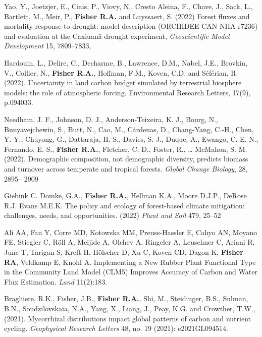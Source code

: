 \documentclass[10pt]{article}
\newenvironment{lonelist}[1][\enskip\textbullet]%
        {\vspace{-\baselineskip}\begin{list}{#1}{%
        \setlength{\itemindent}{-3pt} 
        \setlength{\partopsep}{0pt}%
        \setlength{\leftmargin}{10pt}
        \setlength{\topsep}{15pt}}}
        {\end{list}\vspace{-.3\baselineskip}}
\begin{document}
\begin{lonelist}
\item[72] Yao, Y., Joetzjer, E., Ciais, P., Viovy, N., Cresto Aleina, F., Chave, J., Sack, L., Bartlett, M., Meir, P., \textbf{Fisher R.A.} and Luyssaert, S. (2022) Forest fluxes and mortality response to drought: model description (ORCHIDEE-CAN-NHA r7236) and evaluation at the Caxiuanã drought experiment, \emph{Geoscientific Model Development} 15, 7809–7833, 

\item[71] Hardouin, L., Delire, C., Decharme, B., Lawrence, D.M., Nabel, J.E., Brovkin, V., Collier, N., \textbf{Fisher R.A.}, Hoffman, F.M., Koven, C.D. and Séférian, R. (2022). Uncertainty in land carbon budget simulated by terrestrial biosphere models: the role of atmospheric forcing. Environmental Research Letters, 17(9), p.094033.

\item[70] Needham, J. F., Johnson, D. J., Anderson-Teixeira, K. J., Bourg, N., Bunyavejchewin, S., Butt, N., Cao, M., Cárdenas, D., Chang-Yang, C.-H., Chen, Y.-Y., Chuyong, G., Dattaraja, H. S., Davies, S. J., Duque, A., Ewango, C. E. N., Fernando, E. S., \textbf{Fisher R.A.},  Fletcher, C. D., Foster, R., … McMahon, S. M. (2022). Demographic composition, not demographic diversity, predicts biomass and turnover across temperate and tropical forests. \emph{Global Change Biology}, 28, 2895– 2909

\item[69]  Giebink C. Domke, G.A., \textbf{Fisher R.A.}, Hellman K.A., Moore D.J.P., DeRose R.J. Evans M.E.K.  The policy and ecology of forest-based climate mitigation: challenges, needs, and opportunities.  (2022) \emph{Plant and Soil} 479, 25–52

\item[68] Ali AA, Fan Y, Corre MD, Kotowska MM, Preuss-Hassler E, Cahyo AN, Moyano FE, Stiegler C, Röll A, Meijide A, Olchev A, Ringeler A, Leuschner C, Ariani R, June T, Tarigan S, Kreft H, Hölscher D, Xu C, Koven CD, Dagon K, \textbf{Fisher RA}, Veldkamp E, Knohl A. Implementing a New Rubber Plant Functional Type in the Community Land Model (CLM5) Improves Accuracy of Carbon and Water Flux Estimation. \emph{Land} 11(2):183.

\item [67]  Braghiere, R.K., Fisher, J.B., \textbf{Fisher R.A.}, Shi, M., Steidinger, B.S., Sulman, B.N., Soudzilovskaia, N.A., Yang, X., Liang, J., Peay, K.G. and Crowther, T.W., (2021). Mycorrhizal distributions impact global patterns of carbon and nutrient cycling. \emph{Geophysical Research Letters} 48, no. 19 (2021): e2021GL094514.


\end{lonelist}
\end{document}
